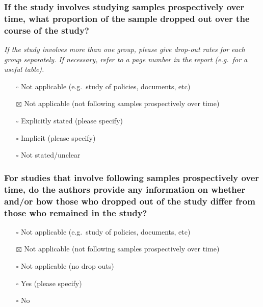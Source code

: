 \documentclass[
  doc, a4paper]{apa7}
\providecommand{\tightlist}{%
  \setlength{\itemsep}{0pt}\setlength{\parskip}{0pt}}
\begin{document}
\subsubsection{If the study involves studying samples prospectively over time, what proportion of the sample dropped out over the course of the study?}\label{if-the-study-involves-studying-samples-prospectively-over-time-what-proportion-of-the-sample-dropped-out-over-the-course-of-the-study}

\emph{If the study involves more than one group, please give drop-out rates for each group separately. If necessary, refer to a page number in the report (e.g.~for a useful table).}

\begin{itemize}
\tightlist
\item[$\square$]
  Not applicable (e.g.~study of policies, documents, etc)
\item[$\boxtimes$]
  Not applicable (not following samples prospectively over time)
\item[$\square$]
  Explicitly stated (please specify)
\item[$\square$]
  Implicit (please specify)
\item[$\square$]
  Not stated/unclear
\end{itemize}

\subsubsection{For studies that involve following samples prospectively over time, do the authors provide any information on whether and/or how those who dropped out of the study differ from those who remained in the study?}\label{for-studies-that-involve-following-samples-prospectively-over-time-do-the-authors-provide-any-information-on-whether-andor-how-those-who-dropped-out-of-the-study-differ-from-those-who-remained-in-the-study}

\begin{itemize}
\tightlist
\item[$\square$]
  Not applicable (e.g.~study of policies, documents, etc)
\item[$\boxtimes$]
  Not applicable (not following samples prospectively over time)
\item[$\square$]
  Not applicable (no drop outs)
\item[$\square$]
  Yes (please specify)
\item[$\square$]
  No
\end{itemize}
\end{document}
